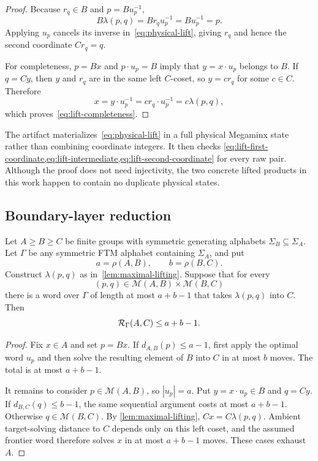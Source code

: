 \begin{proof}
Because $r_q\in B$ and $p=B u_p^{-1}$,
\[
  B\lambda(p,q)=B r_q u_p^{-1}=B u_p^{-1}=p.
\]
Applying $u_p$ cancels its inverse in~\eqref{eq:physical-lift}, giving
$r_q$ and hence the second coordinate $Cr_q=q$.

For completeness, $p=Bx$ and $p\mathbin{\cdot}u_p=B$ imply that
$y=x\mathbin{\cdot}u_p$ belongs to $B$.  If $q=Cy$, then $y$ and $r_q$
are in the same left $C$-coset, so $y=cr_q$ for some $c\in C$.  Therefore
\[
  x=y\mathbin{\cdot}u_p^{-1}
    =c r_q\mathbin{\cdot}u_p^{-1}
    =c\lambda(p,q),
\]
which proves~\eqref{eq:lift-completeness}.
\end{proof}

The artifact materializes~\eqref{eq:physical-lift} in a full physical
Megaminx state rather than combining coordinate integers.  It then checks
\cref{eq:lift-first-coordinate,eq:lift-intermediate,eq:lift-second-coordinate}
for every raw pair.  Although the proof does not need injectivity, the two
concrete lifted products in this work happen to contain no duplicate physical
states.

\subsection{Boundary-layer reduction}
\label{sec:boundary-layer-reduction}

\begin{lemma}
\label{lem:boundary-layer}
Let $A\geq B\geq C$ be finite groups with symmetric generating alphabets
$\Sigma_B\subseteq\Sigma_A$.  Let $\Gamma$ be any symmetric FTM alphabet
containing $\Sigma_A$, and put
\[
  a=\rho(A,B),
  \qquad b=\rho(B,C).
\]
Construct $\lambda(p,q)$ as in~\cref{lem:maximal-lifting}.  Suppose that
for every
\[
  (p,q)\in\mathcal M(A,B)\times\mathcal M(B,C)
\]
there is a word over $\Gamma$ of length at most $a+b-1$ that takes
$\lambda(p,q)$ into $C$.  Then
\[
  \mathcal{R}_{\Gamma}(A,C)\leq a+b-1.
\]
\end{lemma}

\begin{proof}
Fix $x\in A$ and set $p=Bx$.  If $d_{A,B}(p)\leq a-1$, first apply the
optimal word $u_p$ and then solve the resulting element of $B$ into $C$ in at
most $b$ moves.  The total is at most $a+b-1$.

It remains to consider $p\in\mathcal M(A,B)$, so $|u_p|=a$.  Put
$y=x\mathbin{\cdot}u_p\in B$ and $q=Cy$.  If
$d_{B,C}(q)\leq b-1$, the same sequential argument costs at most
$a+b-1$.  Otherwise $q\in\mathcal M(B,C)$.  By
\cref{lem:maximal-lifting}, $Cx=C\lambda(p,q)$.  Ambient target-solving
distance to $C$ depends only on this left coset, and the assumed frontier word
therefore solves $x$ in at most $a+b-1$ moves.  These cases exhaust $A$.
\end{proof}

